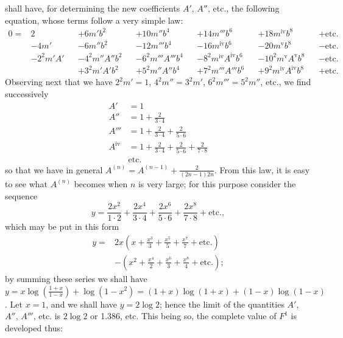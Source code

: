 \documentclass{article}
\begin{document}
shall have, for determining the new coefficients $A'$, $A''$, etc., the following equation, whose terms follow a very simple law:
\[ \begin{aligned} 0={}&2&&+6m'b^{2}&&+10m''b^{4}&&+14m'''b^{6}&&+18m^{\text{iv}}b^{8}&&+\text{etc.}\\ &-4m'&&-6m''b^{2}&&-12m'''b^{4}&&-16m^{\text{iv}}b^{6}&&-20m^{\text{v}}b^{8}&&-\text{etc.}\\ &-2^{2}m'A'&&-4^{2}m''A''b^{2}&&-6^{2}m'''A'''b^{4}&&-8^{2}m^{\text{iv}}A^{\text{iv}}b^{6}&&-10^{2}m^{\text{v}}A^{\text{v}}b^{8}&&-\text{etc.}\\ &&&+3^{2}m'A'b^{2}&&+5^{2}m''A''b^{4}&&+7^{2}m'''A'''b^{6}&&+9^{2}m^{\text{iv}}A^{\text{iv}}b^{8}&&+\text{etc.} \end{aligned} \]
Observing next that we have $2^{2}m'=1$, $4^{2}m''=3^{2}m'$, $6^{2}m'''=5^{2}m''$, etc., we find successively
\[ \begin{aligned} A'&=1\\ A''&=1+\frac{2}{3\cdot 4}\\ A'''&=1+\frac{2}{3\cdot 4}+\frac{2}{5\cdot 6}\\ A^{\text{iv}}&=1+\frac{2}{3\cdot 4}+\frac{2}{5\cdot 6}+\frac{2}{7\cdot 8}\\ &\text{etc.} \end{aligned} \]
so that we have in general $A^{(n)}=A^{(n-1)}+\frac{2}{(2n-1)2n}$. From this law, it is easy to see what $A^{(n)}$ becomes when $n$ is very large; for this purpose consider the sequence
\[ y=\frac{2x^{2}}{1\cdot 2}+\frac{2x^{4}}{3\cdot 4}+\frac{2x^{6}}{5\cdot 6}+\frac{2x^{8}}{7\cdot 8}+\text{etc.}, \]
which may be put in this form
\[ \begin{aligned} y={}&2x\left(x+\frac{x^{3}}{3}+\frac{x^{5}}{5}+\frac{x^{7}}{7}+\text{etc.}\right)\\ &-\left(x^{2}+\frac{x^{4}}{2}+\frac{x^{6}}{3}+\frac{x^{8}}{4}+\text{etc.}\right); \end{aligned} \]
by summing these series we shall have $y=x\log\left(\frac{1+x}{1-x}\right)+\log(1-x^{2})=(1+x)\log(1+x)+(1-x)\log(1-x)$. Let $x=1$, and we shall have $y=2\log 2$; hence the limit of the quantities $A'$, $A''$, $A'''$, etc. is $2\log 2$ or 1.386, etc. This being so, the complete value of $F^{1}$ is developed thus:
\end{document}
